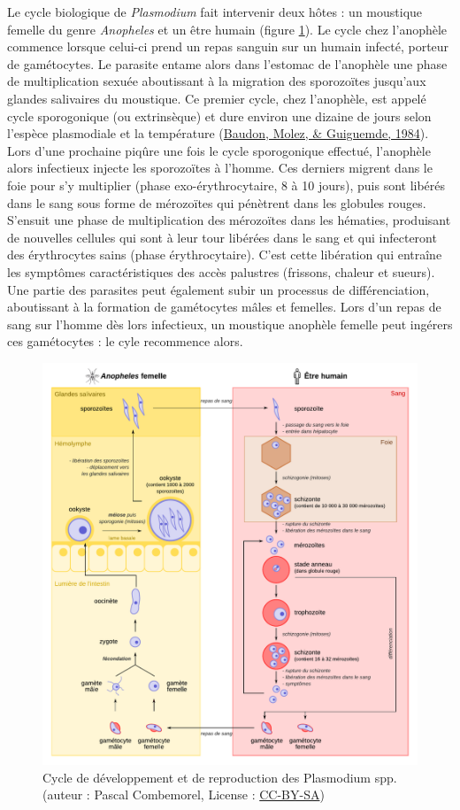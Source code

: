 \documentclass[12pt,twoside]{reedthesis}
\begin{document}
Le cycle biologique de \emph{Plasmodium} fait intervenir deux hôtes : un moustique femelle du genre \emph{Anopheles} et un être humain (figure \ref{fig:cycle-tr-palu}). Le cycle chez l'anophèle commence lorsque celui-ci prend un repas sanguin sur un humain infecté, porteur de gamétocytes. Le parasite entame alors dans l'estomac de l'anophèle une phase de multiplication sexuée aboutissant à la migration des sporozoïtes jusqu'aux glandes salivaires du moustique. Ce premier cycle, chez l'anophèle, est appelé cycle sporogonique (ou extrinsèque) et dure environ une dizaine de jours selon l'espèce plasmodiale et la température (\protect\hyperlink{ref-15172}{Baudon, Molez, \& Guiguemde, 1984}). Lors d'une prochaine piqûre une fois le cycle sporogonique effectué, l'anophèle alors infectieux injecte les sporozoïtes à l'homme. Ces derniers migrent dans le foie pour s'y multiplier (phase exo-érythrocytaire, 8 à 10 jours), puis sont libérés dans le sang sous forme de mérozoïtes qui pénètrent dans les globules rouges. S'ensuit une phase de multiplication des mérozoïtes dans les hématies, produisant de nouvelles cellules qui sont à leur tour libérées dans le sang et qui infecteront des érythrocytes sains (phase érythrocytaire). C'est cette libération qui entraîne les symptômes caractéristiques des accès palustres (frissons, chaleur et sueurs). Une partie des parasites peut également subir un processus de différenciation, aboutissant à la formation de gamétocytes mâles et femelles. Lors d'un repas de sang sur l'homme dès lors infectieux, un moustique anophèle femelle peut ingérers ces gamétocytes : le cyle recommence alors.\\
\begin{figure}

{\centering \includegraphics[width=0.8\linewidth]{figure/cycle_transmission_palu_v2} 

}

\caption[Cycle de développement et de reproduction des Plasmodium spp.]{Cycle de développement et de reproduction des Plasmodium spp. (auteur : Pascal Combemorel, License : \href{https://creativecommons.org/licenses/by-sa/4.0/}{CC-BY-SA})}\label{fig:cycle-tr-palu}
\end{figure}
\end{document}
